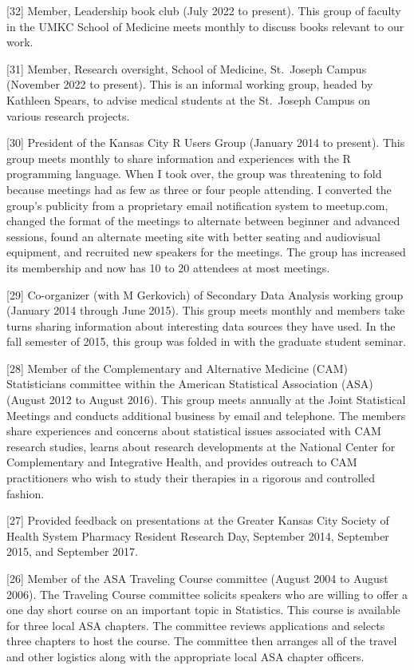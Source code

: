 \documentclass[
  12pt,
]{article}
\begin{document}
{[}32{]} Member, Leadership book club (July 2022 to present). This group
of faculty in the UMKC School of Medicine meets monthly to discuss books
relevant to our work.

{[}31{]} Member, Research oversight, School of Medicine, St.~Joseph
Campus (November 2022 to present). This is an informal working group,
headed by Kathleen Spears, to advise medical students at the St.~Joseph
Campus on various research projects.

{[}30{]} President of the Kansas City R Users Group (January 2014 to
present). This group meets monthly to share information and experiences
with the R programming language. When I took over, the group was
threatening to fold because meetings had as few as three or four people
attending. I converted the group's publicity from a proprietary email
notification system to meetup.com, changed the format of the meetings to
alternate between beginner and advanced sessions, found an alternate
meeting site with better seating and audiovisual equipment, and
recruited new speakers for the meetings. The group has increased its
membership and now has 10 to 20 attendees at most meetings.

{[}29{]} Co-organizer (with M Gerkovich) of Secondary Data Analysis
working group (January 2014 through June 2015). This group meets monthly
and members take turns sharing information about interesting data
sources they have used. In the fall semester of 2015, this group was
folded in with the graduate student seminar.

{[}28{]} Member of the Complementary and Alternative Medicine (CAM)
Statisticians committee within the American Statistical Association
(ASA) (August 2012 to August 2016). This group meets annually at the
Joint Statistical Meetings and conducts additional business by email and
telephone. The members share experiences and concerns about statistical
issues associated with CAM research studies, learns about research
developments at the National Center for Complementary and Integrative
Health, and provides outreach to CAM practitioners who wish to study
their therapies in a rigorous and controlled fashion.

{[}27{]} Provided feedback on presentations at the Greater Kansas City
Society of Health System Pharmacy Resident Research Day, September 2014,
September 2015, and September 2017.

{[}26{]} Member of the ASA Traveling Course committee (August 2004 to
August 2006). The Traveling Course committee solicits speakers who are
willing to offer a one day short course on an important topic in
Statistics. This course is available for three local ASA chapters. The
committee reviews applications and selects three chapters to host the
course. The committee then arranges all of the travel and other
logistics along with the appropriate local ASA chapter officers.
\end{document}
